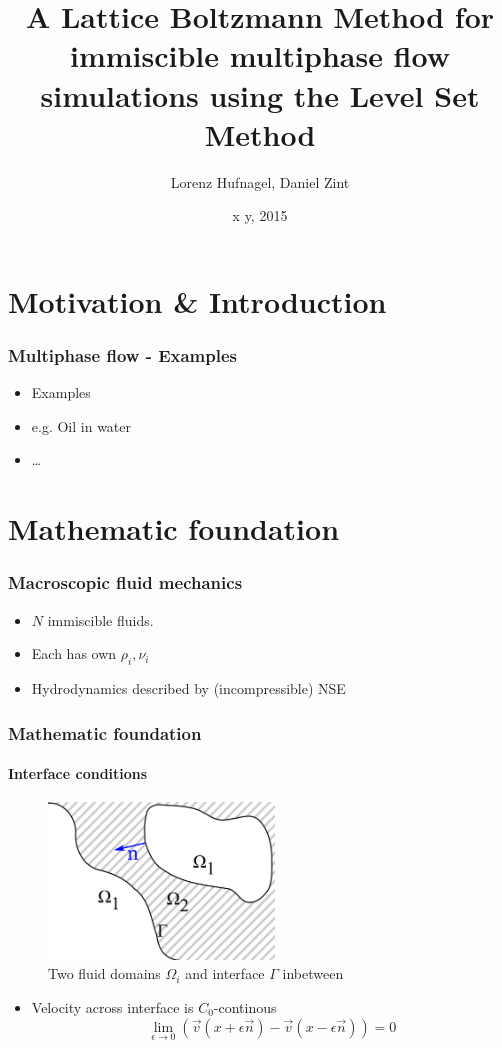 \documentclass[ucs]{beamer}
\title{A Lattice Boltzmann Method for immiscible multiphase flow simulations using the Level Set Method} %
\author{Lorenz Hufnagel, Daniel Zint} %
\institute{BGCE Student Project}
\date{x y, 2015} %
\begin{document}
\maketitle %

\section{Motivation \& Introduction}

\begin{frame}
\frametitle{Multiphase flow - Examples}
\begin{itemize}
\item<1-> Examples
\item<2-> e.g. Oil in water 
\item<3-> \ldots
\end{itemize}
\end{frame}

\section{Mathematic foundation}
\begin{frame}
\frametitle{Macroscopic fluid mechanics}

\begin{itemize}
\item<1-> $N$ immiscible fluids.
\item<2-> Each has own $\rho_i, \nu_i$
\item<3-> Hydrodynamics described by (incompressible) NSE
\end{itemize}
\end{frame}

\begin{frame}
\frametitle{Mathematic foundation}
\framesubtitle{Interface conditions}
\begin{figure}[h!]
\includegraphics[width=6cm]{skizze.png}
  \caption{Two fluid domains $\Omega_i$ and interface $\Gamma$ inbetween}
\end{figure}
\begin{itemize}
\item<1-> Velocity across interface is $C_0$-continous 
  $$\lim_{\epsilon \to 0}(\vec v\left(x+\epsilon \vec n\right) -\vec v(x-\epsilon \vec n))=0$$
\end{itemize}
\end{frame}
\end{document}
